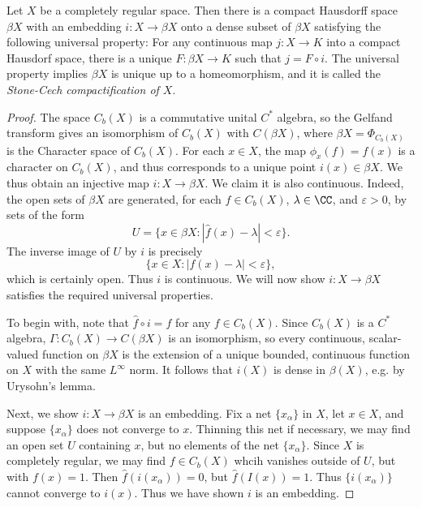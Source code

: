 \begin{theorem}
    Let $X$ be a completely regular space. Then there is a compact Hausdorff space $\beta X$ with an embedding $i: X \to \beta X$ onto a dense subset of $\beta X$ satisfying the following universal property: For any continuous map $j: X \to K$ into a compact Hausdorf space, there is a unique $F: \beta X \to K$ such that $j = F \circ i$. The universal property implies $\beta X$ is unique up to a homeomorphism, and it is called the \emph{Stone-Cech compactification of $X$}.
\end{theorem}
\begin{proof}
    The space $C_b(X)$ is a commutative unital $C^*$ algebra, so the Gelfand transform gives an isomorphism of $C_b(X)$ with $C(\beta X)$, where $\beta X = \Phi_{C_b(X)}$ is the Character space of $C_b(X)$. For each $x \in X$, the map $\phi_x(f) = f(x)$ is a character on $C_b(X)$, and thus corresponds to a unique point $i(x) \in \beta X$. We thus obtain an injective map $i: X \to \beta X$. We claim it is also continuous. Indeed, the open sets of $\beta X$ are generated, for each $f \in C_b(X)$, $\lambda \in \CC$, and $\varepsilon > 0$, by sets of the form
    \[ U = \{ x \in \beta X: |\widehat{f}(x) - \lambda| < \varepsilon \}. \]
    The inverse image of $U$ by $i$ is precisely
    \[ \{ x \in X : |f(x) - \lambda| < \varepsilon \}, \]
    which is certainly open. Thus $i$ is continuous. We will now show $i: X \to \beta X$ satisfies the required universal properties.

    To begin with, note that $\widehat{f} \circ i = f$ for any $f \in C_b(X)$. Since $C_b(X)$ is a $C^*$ algebra, $\Gamma: C_b(X) \to C(\beta X)$ is an isomorphism, so every continuous, scalar-valued function on $\beta X$ is the extension of a unique bounded, continuous function on $X$ with the same $L^\infty$ norm. It follows that $i(X)$ is dense in $\beta(X)$, e.g. by Urysohn's lemma.

    Next, we show $i: X \to \beta X$ is an embedding. Fix a net $\{ x_\alpha \}$ in $X$, let $x \in X$, and suppose $\{ x_\alpha \}$ does not converge to $x$. Thinning this net if necessary, we may find an open set $U$ containing $x$, but no elements of the net $\{ x_\alpha \}$. Since $X$ is completely regular, we may find $f \in C_b(X)$ whcih vanishes outside of $U$, but with $f(x) = 1$. Then $\widehat{f}(i(x_\alpha)) = 0$, but $\widehat{f}(I(x)) = 1$. Thus $\{ i(x_\alpha) \}$ cannot converge to $i(x)$. Thus we have shown $i$ is an embedding.


\end{proof}
